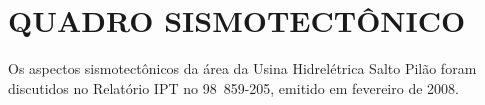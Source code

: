 \section{QUADRO SISMOTECTÔNICO}
\par{Os aspectos sismotectônicos da área da Usina Hidrelétrica Salto Pilão foram discutidos no Relatório IPT no 98 859-205, emitido em fevereiro de 2008.}
